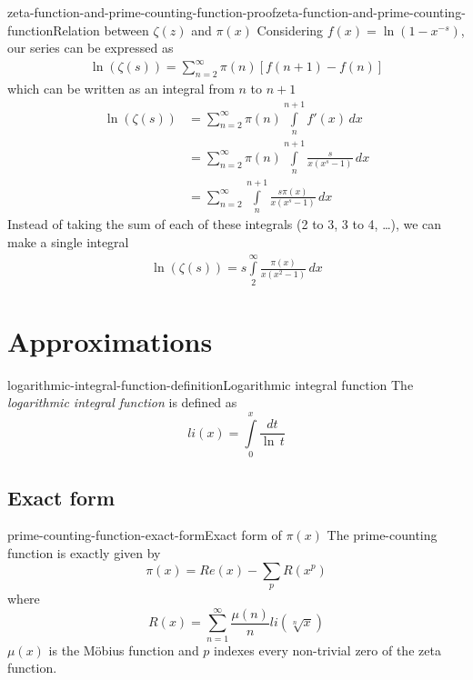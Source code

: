 \documentclass[preview]{standalone}
\begin{document}
\begin{snippetproof}{zeta-function-and-prime-counting-function-proof}{zeta-function-and-prime-counting-function}{Relation between \(\zeta(z)\) and \(\pi(x)\)}
    Considering \(f(x)=\ln(1-x^{-s})\), our series can be expressed as
    \begin{align*}
        \ln\left(\zeta(s)\right)=
        \sum_{n=2}^{\infty}\pi(n)\left[f(n+1)-f(n)\right]
    \end{align*}
    which can be written as an integral from \(n\) to \(n+1\)
    \begin{align*}
        \ln\left(\zeta(s)\right)&=
        \sum_{n=2}^{\infty}\pi(n)
        \int\limits_n^{n+1} f'(x)\,dx
        \\
        &=
        \sum_{n=2}^{\infty}\pi(n)
        \int\limits_n^{n+1}
        \frac{s}{x(x^s-1)}\,dx
        \\
        &=
        \sum_{n=2}^{\infty}
        \int\limits_n^{n+1}
        \frac{s\pi(x)}{x(x^s-1)}\,dx
    \end{align*}
    Instead of taking the sum of each of these integrals (2 to 3, 3 to 4, \ldots), we can make a single integral
    \begin{align*}
        \ln\left(\zeta(s)\right)=
        s\int\limits_2^\infty
        \frac{\pi(x)}{x(x^2-1)}\,dx
    \end{align*}
\end{snippetproof}

\section{Approximations}


\begin{snippetdefinition}{logarithmic-integral-function-definition}{Logarithmic integral function}
    The \textit{logarithmic integral function} is defined as
    \[
        li(x)=\int\limits_0^{x} \frac{dt}{\ln\,t}
    \]
\end{snippetdefinition}


\subsection{Exact form}

\begin{snippettheorem}{prime-counting-function-exact-form}{Exact form of \(\pi(x)\)}
    The prime-counting function is exactly given by
    \[
        \pi(x)=Re(x)-\sum_{p}R(x^p)
    \]
    where
    \[
        R(x)=\sum_{n=1}^{\infty}\frac{\mu(n)}{n}li(\sqrt[n]{x})
    \]
    \(\mu(x)\) is the Möbius function and
    \(p\) indexes every non-trivial zero of the zeta function.
\end{snippettheorem}
\end{document}
